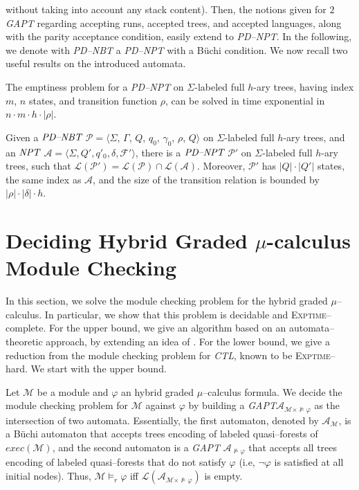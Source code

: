 \documentclass{LMCS}
\theoremstyle{plain}
\def \A             {\mathcal{A}}
\def \CTL           {\emph{CTL}\xspace}
\def \EXPTIME       {\textsc{Exptime}\xspace}
\def \F             {\mathcal{F}}
\def \GAPT          {\emph{GAPT}\xspace}
\def \L             {\mathcal{L}}
\def \M             {\mathcal{M}}
\def \NPT           {\emph{NPT}\xspace}
\def \P             {\mathcal{P}}
\def \PDNBT         {\emph{PD--NBT}\xspace}
\def \PDNPT         {\emph{PD--NPT}\xspace}
\def \TGAPT         {\emph{$2$GAPT}\xspace}
\newcommand \tpl[1] {\langle #1 \rangle}
\begin{document}
without taking into account any stack content). Then, the notions
given for \TGAPT regarding accepting runs, accepted trees, and
accepted languages, along with the parity acceptance condition,
easily extend to \PDNPT. In the following, we denote with \PDNBT a
\PDNPT with a B\"uchi condition. We now recall two useful results
on the introduced automata.
\begin{prop}\label{prop:EmptinessForPD-NBT}
The emptiness problem for a \PDNPT on $\Sigma$-labeled full
$h$-ary trees, having index $m$, $n$ states, and transition
function $\rho$, can be solved in time exponential in $n \cdot m
\cdot h \cdot |\rho|$.
\end{prop}
\begin{prop}\label{pro:ClosureUnderIntersection}
Given a $\PDNBT$ $\P = \langle \Sigma$, $\Gamma$, $Q$, $q_0$,
$\gamma_0$, $\rho$, $Q \rangle$ on $\Sigma$-labeled full $h$-ary
trees, and an $\NPT$ $\A = \tpl{\Sigma, Q', q'_0, \delta, \F'}$,
there is a $\PDNPT$ $\P'$ on $\Sigma$-labeled full $h$-ary trees,
such that $\L(\P') = \L(\P) \cap \L(\A)$. Moreover, $\P'$ has
$|Q|\cdot |Q'|$ states, the same index as $\A$, and the size of
the transition relation is bounded by $|\rho| \cdot |\delta| \cdot
h$.
\end{prop}


\section{Deciding Hybrid Graded $\mu$-calculus Module Checking}\label{sec:DecidingHybridGradedModuleChecking}
In this section, we solve the module checking problem for the
hybrid graded $\mu$--calculus. In particular, we show that this
problem is decidable and \EXPTIME--complete. For the upper bound,
we give an algorithm based on an automata--theoretic approach, by
extending an idea of \cite{KVW01}. For the lower bound, we give a
reduction from the module checking problem for \CTL, known to be
\EXPTIME--hard. We start with the upper bound.

Let $\M$ be a module and $\varphi$ an hybrid graded
$\mu$--calculus formula. We decide the module checking problem for
$\M$ against $\varphi$ by building a \GAPT $\A_{\M \times
\not\models\varphi}$ as the intersection of two automata.
Essentially, the first automaton, denoted by $\A_{\M}$, is a
B\"{u}chi automaton that accepts trees encoding of labeled
quasi--forests of $exec(\M)$, and the second automaton is a \GAPT
$\A_{\not\models\varphi}$ that accepts all trees encoding of
labeled quasi--forests that do not satisfy $\varphi$ (i.e, $\neg
\varphi$ is satisfied at all initial nodes). Thus, $\M \models_r
\varphi$ iff $\L(\A_{\M \times \not\models\varphi})$ is empty.
\end{document}
